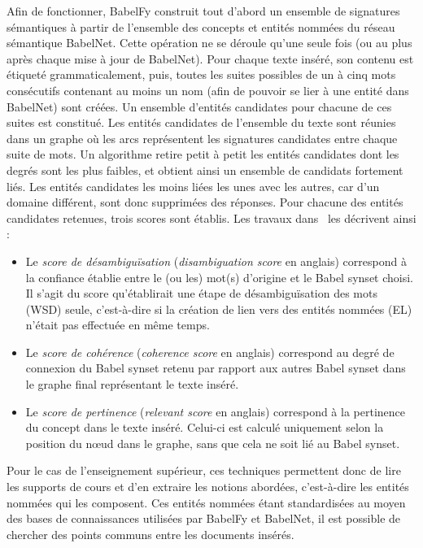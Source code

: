 Afin de fonctionner, BabelFy construit tout d'abord un ensemble de signatures sémantiques à partir de l'ensemble des concepts et entités nommées du réseau sémantique BabelNet.
Cette opération ne se déroule qu'une seule fois (ou au plus après chaque mise à jour de BabelNet).
Pour chaque texte inséré, son contenu est étiqueté grammaticalement, puis, toutes les suites possibles de un à cinq mots consécutifs contenant au moins un nom (afin de pouvoir se lier à une entité dans BabelNet) sont créées.
Un ensemble d'entités candidates pour chacune de ces suites est constitué.
Les entités candidates de l'ensemble du texte sont réunies dans un graphe où les arcs représentent les signatures candidates entre chaque suite de mots.
Un algorithme retire petit à petit les entités candidates dont les degrés sont les plus faibles, et obtient ainsi un ensemble de candidats fortement liés.
Les entités candidates les moins liées les unes avec les autres, car d'un domaine différent, sont donc supprimées des réponses.
Pour chacune des entités candidates retenues, trois scores sont établis.
Les travaux dans~\cite{prohaska2017masterthesis} les décrivent ainsi :
\begin{itemize}
\item Le \textit{score de désambiguïsation} (\textit{disambiguation score} en anglais) correspond à la confiance établie entre le (ou les) mot(s) d'origine et le Babel synset choisi. Il s'agit du score qu'établirait une étape de désambiguïsation des mots (WSD) seule, c'est-à-dire si la création de lien vers des entités nommées (EL) n'était pas effectuée en même temps.
\item Le \textit{score de cohérence} (\textit{coherence score} en anglais) correspond au degré de connexion du Babel synset retenu par rapport aux autres Babel synset dans le graphe final représentant le texte inséré.
\item Le \textit{score de pertinence} (\textit{relevant score} en anglais) correspond à la pertinence du concept dans le texte inséré. Celui-ci est calculé uniquement selon la position du n\oe{}ud dans le graphe, sans que cela ne soit lié au Babel synset.
\end{itemize}

\bigskip

Pour le cas de l'enseignement supérieur, ces techniques permettent donc de lire les supports de cours et d'en extraire les notions abordées, c'est-à-dire les entités nommées qui les composent.
Ces entités nommées étant standardisées au moyen des bases de connaissances utilisées par BabelFy et BabelNet, il est possible de chercher des points communs entre les documents insérés.



